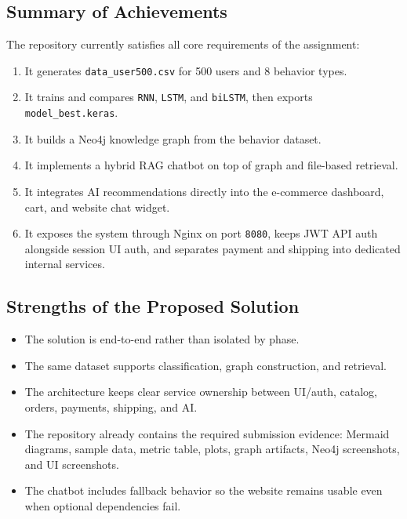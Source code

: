 \documentclass[12pt,a4paper]{article}
\begin{document}
\subsection{Summary of Achievements}
The repository currently satisfies all core requirements of the assignment:
\begin{enumerate}[label=\arabic*.]
  \item It generates \texttt{data\_user500.csv} for 500 users and 8 behavior types.
  \item It trains and compares \texttt{RNN}, \texttt{LSTM}, and \texttt{biLSTM}, then exports \texttt{model\_best.keras}.
  \item It builds a Neo4j knowledge graph from the behavior dataset.
  \item It implements a hybrid RAG chatbot on top of graph and file-based retrieval.
  \item It integrates AI recommendations directly into the e-commerce dashboard, cart, and website chat widget.
  \item It exposes the system through Nginx on port \texttt{8080}, keeps JWT API auth alongside session UI auth, and separates payment and shipping into dedicated internal services.
\end{enumerate}

\subsection{Strengths of the Proposed Solution}
\begin{itemize}
  \item The solution is end-to-end rather than isolated by phase.
  \item The same dataset supports classification, graph construction, and retrieval.
  \item The architecture keeps clear service ownership between UI/auth, catalog, orders, payments, shipping, and AI.
  \item The repository already contains the required submission evidence: Mermaid diagrams, sample data, metric table, plots, graph artifacts, Neo4j screenshots, and UI screenshots.
  \item The chatbot includes fallback behavior so the website remains usable even when optional dependencies fail.
\end{itemize}
\end{document}
